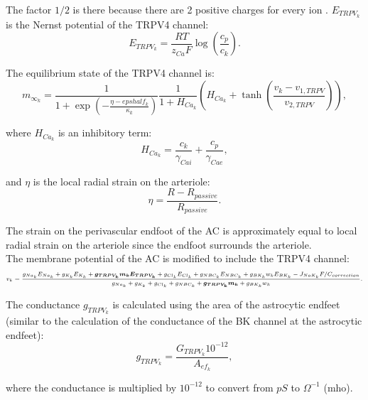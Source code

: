 	The factor $1/2$ is there because there are 2 positive charges for every \ca ion \citep{Witthoft2013a}. 
	$E_{TRPV_k}$ is the Nernst potential of the TRPV4 channel:
		\begin{equation}
		E_{TRPV_k} = \frac{RT}{z_{Ca} F} \log \left(\frac{c_p}{c_k} \right).
		\end{equation}
				
	The equilibrium state of the TRPV4 channel is:
		\begin{equation}
		m_{\infty_k} = \frac{1}{1+\exp \left( {-\frac{\eta - epshalf_k}{\kappa_k}} \right) } 
						\frac{1}{1 + H_{Ca_k}} \left( H_{Ca_k} + \tanh \left( \frac{v_k - v_{1,TRPV}}{v_{2,TRPV}} \right) \right), 
		\end{equation}
	
	where $H_{Ca_k}$ is an inhibitory term:
		\begin{equation}
		H_{Ca_k} = \frac{c_k}{\gamma_{Cai}} + \frac{c_p}{\gamma_{Cae}},
		\end{equation}
	
	and $\eta$ is the local radial strain on the arteriole:
		\begin{equation}
		\eta = \frac{R - R_{passive}}{R_{passive}}.
		\end{equation}
	
	The strain on the perivascular endfoot of the AC is approximately equal to local radial strain on the arteriole since the endfoot surrounds the arteriole.	
	\\
	
	The membrane potential of the AC is modified to include the TRPV4 channel:
		\begin{equation}
		\centering
		\scriptsize{
		v_k = \frac{g_{Na_k} E_{Na_k} + g_{K_k} E_{K_k} + \bm{g_{TRPV_k} m_k E_{TRPV_k}} + 
	        g_{Cl_k} E_{Cl_k} + g_{NBC_k} E_{NBC_k} + 		                g_{BK_k} w_k E_{BK_k} - 
	        J_{NaK_k} F / C_{correction}}{ g_{Na_k} + g_{K_k} + g_{Cl_k} + g_{NBC_k} + \bm{ g_{TRPV_k} m_k } + g_{BK_k} w_k }.
	   }
		\end{equation}
	
	The conductance $g_{TRPV_k}$ is calculated using the area of the astrocytic endfeet (similar to the calculation of the conductance of the BK channel at the astrocytic endfeet):
		\begin{equation}
		g_{TRPV_k} = \frac{G_{TRPV_k} 10^{-12}}{A_{ef_k}},
		\end{equation}
	
	where the conductance is multiplied by $10^{-12}$ to convert from $pS$ to $\Omega^{-1}$ (mho).
	
